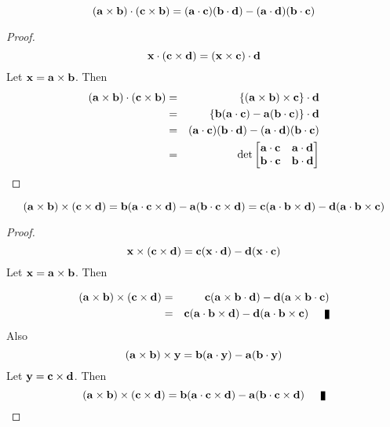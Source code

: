 \begin{theorem}
\[ ({\bf a} \times {\bf b}) \cdot ({\bf c} \times {\bf b}) = ({\bf a}\cdot {\bf c})({\bf b}\cdot {\bf d}) - ({\bf a}\cdot {\bf d})({\bf b}\cdot {\bf c}) \]
\end{theorem}
\begin{proof}
\[ {\bf x}\cdot ({\bf c}\times{\bf d}) = ({\bf x}\times {\bf c})\cdot{\bf d}\] Let ${\bf x} = {\bf a}\times{\bf b}$. Then 
\begin{eqnarray*}
({\bf a} \times {\bf b}) \cdot ({\bf c} \times {\bf b}) &=&\{({\bf a} \times {\bf b})  \times {\bf c}\} \cdot {\bf d} \\
&=& \{{\bf b}({\bf a}\cdot {\bf c}) - {\bf a}({\bf b}\cdot {\bf c}) \}\cdot {\bf d} \\
&=& ({\bf a}\cdot {\bf c})({\bf b}\cdot {\bf d}) - ({\bf a}\cdot {\bf d})({\bf b}\cdot {\bf c}) \\
&=&\det\begin{bmatrix}
{\bf a}\cdot {\bf c} & {\bf a}\cdot {\bf d} \\
{\bf b}\cdot {\bf c} & {\bf b}\cdot {\bf d}
\end{bmatrix}
\end{eqnarray*} 
\end{proof}

\begin{theorem}
\[ ({\bf a} \times {\bf b}) \times ({\bf c} \times {\bf d}) = {\bf b}({\bf a}\cdot {\bf c}\times {\bf d}) - {\bf a}({\bf b}\cdot {\bf c}\times {\bf d}) =  {\bf c}({\bf a}\cdot {\bf b}\times {\bf d}) - {\bf d}({\bf a}\cdot {\bf b}\times {\bf c})\]
\end{theorem}
\begin{proof}
\[ {\bf x} \times ({\bf c} \times {\bf d}) = {\bf c}({\bf x}\cdot {\bf d}) - {\bf d}({\bf x}\cdot {\bf c}) \] Let ${\bf x} = {\bf a}\times {\bf b}$. Then 

\begin{eqnarray*}
({\bf a} \times {\bf b}) \times ({\bf c} \times {\bf d}) &=& {\bf c}({\bf a}\times {\bf b}\cdot {\bf d}) - {\bf d}({\bf a}\times {\bf b}\cdot {\bf c}) \\ 
 &=& {\bf c}({\bf a}\cdot {\bf b}\times {\bf d}) - {\bf d}({\bf a}\cdot {\bf b}\times{\bf c})\qed
\end{eqnarray*}
Also 
\[ ({\bf a} \times {\bf b}) \times {\bf y}  = {\bf b}({\bf a}\cdot {\bf y}) - {\bf a}({\bf b}\cdot {\bf y}) \] Let ${\bf y} = {\bf c}\times {\bf d}$. Then 
\[({\bf a} \times {\bf b}) \times ({\bf c} \times {\bf d}) ={\bf b}({\bf a}\cdot {\bf c}\times{\bf d}) - {\bf a}({\bf b}\cdot {\bf c}\times{\bf d})\qed\]
\end{proof}


